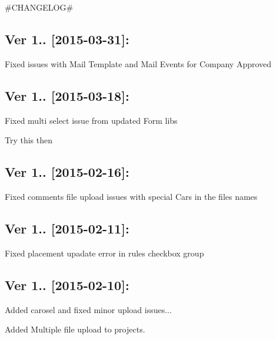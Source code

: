 \#\+C\+H\+A\+N\+G\+E\+L\+O\+G\#

\subsection*{Ver 1.. \mbox{[}2015-\/03-\/31\mbox{]}\+: }


\begin{DoxyItemize}
\item Fixed issues with Mail Template and Mail Events for Company Approved
\end{DoxyItemize}

\subsection*{Ver 1.. \mbox{[}2015-\/03-\/18\mbox{]}\+: }


\begin{DoxyItemize}
\item Fixed multi select issue from updated Form libs
\item Try this then
\end{DoxyItemize}

\subsection*{Ver 1.. \mbox{[}2015-\/02-\/16\mbox{]}\+: }


\begin{DoxyItemize}
\item Fixed comments file upload issues with special Cars in the files names
\end{DoxyItemize}

\subsection*{Ver 1.. \mbox{[}2015-\/02-\/11\mbox{]}\+: }


\begin{DoxyItemize}
\item Fixed placement upadate error in rules checkbox group
\end{DoxyItemize}

\subsection*{Ver 1.. \mbox{[}2015-\/02-\/10\mbox{]}\+: }


\begin{DoxyItemize}
\item Added carosel and fixed minor upload issues...
\item Added Multiple file upload to projects.
\end{DoxyItemize}

